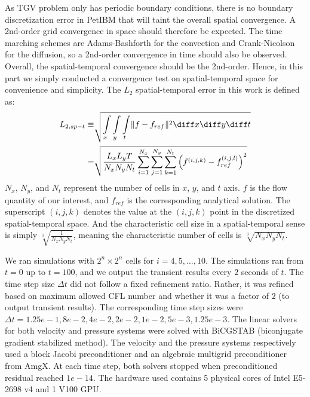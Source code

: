 As TGV problem only has periodic boundary conditions, there is no boundary discretization error in PetIBM that will taint the overall spatial convergence.
A 2nd-order grid convergence in space should therefore be expected.
The time marching schemes are Adams-Bashforth for the convection and Crank-Nicolson for the diffusion, so a 2nd-order convergence in time should also be observed.
Overall, the spatial-temporal convergence should be the 2nd-order.
Hence, in this part we simply conducted a convergence test on spatial-temporal space for  convenience and simplicity.
The $L_2$ spatial-temporal error in this work is defined as:
\begin{equation}\label{eq:spt-err-def}
    \begin{aligned}
    L_{2,sp-t} \equiv &\sqrt{\int\limits_{x} \int\limits_{y} \int\limits_{t} \lVert f - f_{ref} \rVert^2 \diff x \diff y \diff t} \\
    = &
    \sqrt{\frac{L_x L_y T}{N_x N_y N_t}\sum\limits_{i=1}^{N_x}\sum\limits_{j=1}^{N_y}\sum\limits_{k=1}^{N_t}\left(f^{(i, j, k)} - f_{ref}^{(i, j, l)}\right)^2}
    \end{aligned}
\end{equation}
$N_x$, $N_y$, and $N_t$ represent the number of cells in $x$, $y$, and $t$ axis.
$f$ is the flow quantity of our interest, and $f_{ref}$ is the corresponding analytical solution.
The superscript $(i, j, k)$ denotes the value at the $(i, j, k)$ point in the discretized spatial-temporal space.
And the characteristic cell size in a spatial-temporal sense is simply $\sqrt[3]{\frac{1}{N_x N_y N_t}}$, meaning the characteristic number of cells is $\sqrt[3]{N_x N_y N_t}$.

We ran simulations with $2^{n} \times 2^{n}$ cells for $i=4, 5, \dots, 10$.
The simulations ran from $t=0$ up to $t=100$, and we output the transient results every $2$ seconds of $t$.
The time step size $\Delta t$ did not follow a fixed refinement ratio.
Rather, it was refined based on maximum allowed CFL number and whether it was a factor of $2$ (to output transient results).
The corresponding time step sizes were $\Delta t = 1.25e-1, 8e-2, 4e-2, 2e-2, 1e-2, 5e-3, 1.25e-3$.
The linear solvers for both velocity and pressure systems were solved with BiCGSTAB (biconjugate gradient stabilized method).
The velocity and the pressure systems respectively used a block Jacobi preconditioner and an algebraic multigrid preconditioner from AmgX.
At each time step, both solvers stopped when preconditioned residual reached $1e-14$.
The hardware used contains 5 physical cores of Intel E5-2698 v4 and 1 V100 GPU.

